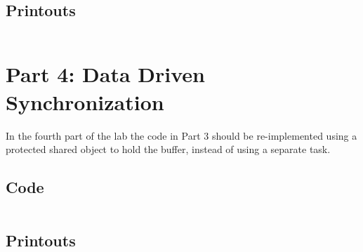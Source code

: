 \documentclass[a4paper,10pt]{article}
\begin{document}
\begin{lstlisting}

\end{lstlisting}

\subsection{Printouts}

\begin{lstlisting}[language=Bash]

\end{lstlisting}

\section{Part 4: Data Driven Synchronization}

In the fourth part of the lab the code in Part 3 should be re-implemented using a protected shared object to hold the buffer, instead of using a separate task.

\subsection{Code}

\begin{lstlisting}

\end{lstlisting}

\subsection{Printouts}

\begin{lstlisting}[language=Bash]

\end{lstlisting}
\end{document}
